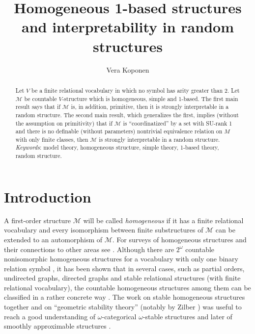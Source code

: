 \documentclass[11pt, twoside]{amsart}
\title[Homogeneous 1-based structures]
{Homogeneous 1-based structures and interpretability in random structures}
\author{Vera Koponen}
\numberwithin{equation}{section}
\newcommand{\mcM}{\mathcal{M}}
\begin{document}
\begin{abstract}
Let $V$ be a finite relational vocabulary in which no symbol has arity greater than 2.
Let $\mcM$ be countable $V$-structure which is homogeneous, simple and 1-based.
The first main result says that if $\mcM$ is, in addition, primitive, then it is strongly interpretable in a random structure.
The second main result, which generalizes the first, implies (without the assumption on primitivity) that if $\mcM$ is 
``coordinatized'' by a set with SU-rank 1 and there is no definable (without parameters) nontrivial
equivalence relation on $M$ with only finite classes, then $\mcM$ is strongly interpretable in
a random structure.
\\
\noindent
{\em Keywords}: model theory, homogeneous structure, simple theory, 1-based theory, random structure.
\end{abstract}


\maketitle


\section{Introduction}

\noindent
A first-order structure $\mcM$ will be called {\em homogeneous} if it has a finite relational vocabulary 
and every isomorphism between finite substructures of $\mcM$ can be extended to an automorphism of $\mcM$.
For surveys of homogeneous structures and their connections to other areas see 
\cite{BP, Che98, HN, Mac10, Nes}.
Although there are $2^\omega$ countable nonisomorphic homogeneous structures for a vocabulary with only one binary relation symbol
\cite{Hen72},
it has been shown that in several cases, such as partial orders, undirected graphs, directed graphs and
stable relational structures (with finite relational  vocabulary), the countable homogeneous structures among them
can be classified in a rather concrete way \cite{Che98, Gar, GK, JTS, Lach84, Lach97, LT, LW, Schm, Shee}.
The work on stable homogeneous structures together and on ``geometric stability theory'' (notably by Zilber \cite{Zil})
was useful to reach a good understanding of
$\omega$-categorical $\omega$-stable structures \cite{CHL} and later of smoothly approximable structures \cite{CH, KLM}.
\end{document}
